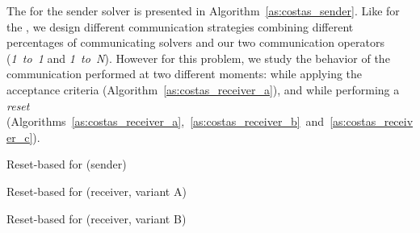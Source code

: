 The \as{} for the sender solver is presented in Algorithm~\ref{as:costas_sender}. Like for the \sgp, we design different communication strategies combining different percentages of communicating solvers and our two communication operators ({\it 1~to~1} and {\it 1~to~N}). However for this problem, we study the behavior of the communication performed at two different moments: while applying the acceptance criteria (Algorithm~\ref{as:costas_receiver_a}), and while performing a {\it reset} (Algorithms~\ref{as:costas_receiver_a},~\ref{as:costas_receiver_b}~and~\ref{as:costas_receiver_c}).

\begin{algorithm}[H]
\dontprintsemicolon
\SetNoline
{}
\caption{Reset-based \as{} for \CARRP{} (sender)}\label{as:costas_sender}
\end{algorithm}

\begin{algorithm}[H]
\dontprintsemicolon
\SetNoline
{}
\caption{Reset-based \as{} for \CARRP{} (receiver, variant A)}\label{as:costas_receiver_a}
\end{algorithm}

\begin{algorithm}[H]
\dontprintsemicolon
\SetNoline
{}
\caption{Reset-based \as{} for \CARRP{} (receiver, variant B)}\label{as:costas_receiver_b}
\end{algorithm}

